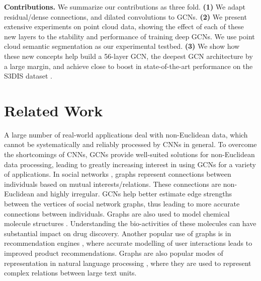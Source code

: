 \documentclass[10pt,twocolumn,letterpaper]{article}
\newcommand{\mysection}[1]{\vspace{3pt}\noindent\textbf{#1.}}
\begin{document}
\vspace{6pt}\mysection{Contributions} We summarize our contributions as three fold. \textbf{(1)} We adapt residual/dense connections, and dilated convolutions to GCNs. \textbf{(2)} We present extensive experiments on point cloud data, showing the effect of each of these new layers to the stability and performance of training deep GCNs. We use point cloud semantic segmentation as our experimental testbed. \textbf{(3)} We show how these new concepts help build a 56-layer GCN, the deepest GCN architecture by a large margin, and achieve close to  boost in state-of-the-art performance on the S3DIS dataset \cite{2017arXiv170201105A}.


\section{Related Work}
\label{sec:related}
A large number of real-world applications deal with non-Euclidean data, which cannot be systematically and reliably processed by CNNs in general. To overcome the shortcomings of CNNs, GCNs provide well-suited solutions for non-Euclidean data processing, leading to greatly increasing interest in using GCNs for a variety of applications. In social networks \cite{social_tang2009relational}, graphs represent connections between individuals based on mutual interests/relations. These connections are non-Euclidean and highly irregular. GCNs help better estimate edge strengths between the vertices of social network graphs, thus leading to more accurate connections between individuals. Graphs are also used to model chemical molecule structures \cite{chem_zitnik2017predicting,chem_wale2008comparison}. Understanding the bio-activities of these molecules can have substantial impact on drug discovery. Another popular use of graphs is in recommendation engines \cite{rec_monti2017geometric,rec_ying2018graph}, where accurate modelling of user interactions leads to improved product recommendations. Graphs are also popular modes of representation in natural language processing \cite{nlp_bastings2017graph,nlp_marcheggiani2017encoding}, where they are used to represent complex relations between large text units. 
\end{document}
